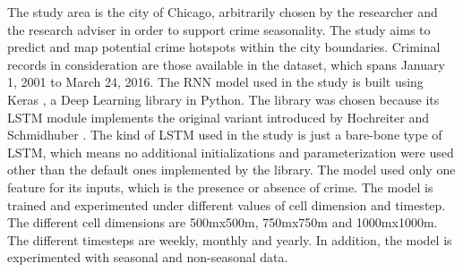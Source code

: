     The study area is the city of Chicago, arbitrarily chosen by the researcher and the research adviser in order to support crime seasonality. The study aims to predict and map potential crime hotspots within the city boundaries. Criminal records in consideration are those available in the dataset, which spans January 1, 2001 to March 24, 2016. The RNN model used in the study is built using Keras \cite{chollet2015keras}, a Deep Learning library in Python. The library was chosen because its LSTM module implements the original variant introduced by Hochreiter and Schmidhuber \cite{hochreiter1997long}. The kind of LSTM used in the study is just a bare-bone type of LSTM, which means no additional initializations and parameterization were used other than the default ones implemented by the library. The model used only one feature for its inputs, which is the presence or absence of crime. The model is trained and experimented under different values of cell dimension and timestep. The different cell dimensions are 500mx500m, 750mx750m and 1000mx1000m. The different timesteps are weekly, monthly and yearly. In addition, the model is experimented with seasonal and non-seasonal data.
